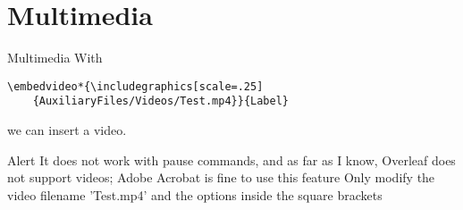 
\section{Multimedia}

\begin{frame}[fragile, squeeze, shrink=12.5]{Multimedia}
With
\begin{verbatim}\embedvideo*{\includegraphics[scale=.25]
    {AuxiliaryFiles/Videos/Test.mp4}}{Label}\end{verbatim}
we can insert a video.
\begin{center}
\end{center}

\begin{alertblock}{Alert}
It does not work with pause commands, and as far as I know, Overleaf does not support videos; Adobe Acrobat is fine to use this feature\newline
Only modify the video filename 'Test.mp4' and the options inside the square brackets
\end{alertblock}
\end{frame}